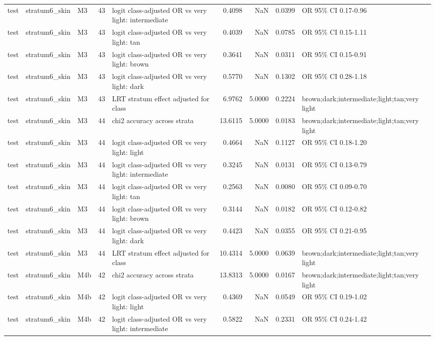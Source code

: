 \begin{tabular}{lllrlrrrl}
test & stratum6\_skin & M3 & 43 & logit class-adjusted OR vs very light: intermediate & 0.4098 & NaN & 0.0399 & OR 95\% CI 0.17-0.96 \\
test & stratum6\_skin & M3 & 43 & logit class-adjusted OR vs very light: tan & 0.4039 & NaN & 0.0785 & OR 95\% CI 0.15-1.11 \\
test & stratum6\_skin & M3 & 43 & logit class-adjusted OR vs very light: brown & 0.3641 & NaN & 0.0311 & OR 95\% CI 0.15-0.91 \\
test & stratum6\_skin & M3 & 43 & logit class-adjusted OR vs very light: dark & 0.5770 & NaN & 0.1302 & OR 95\% CI 0.28-1.18 \\
test & stratum6\_skin & M3 & 43 & LRT stratum effect adjusted for class & 6.9762 & 5.0000 & 0.2224 & brown;dark;intermediate;light;tan;very light \\
test & stratum6\_skin & M3 & 44 & chi2 accuracy across strata & 13.6115 & 5.0000 & 0.0183 & brown;dark;intermediate;light;tan;very light \\
test & stratum6\_skin & M3 & 44 & logit class-adjusted OR vs very light: light & 0.4664 & NaN & 0.1127 & OR 95\% CI 0.18-1.20 \\
test & stratum6\_skin & M3 & 44 & logit class-adjusted OR vs very light: intermediate & 0.3245 & NaN & 0.0131 & OR 95\% CI 0.13-0.79 \\
test & stratum6\_skin & M3 & 44 & logit class-adjusted OR vs very light: tan & 0.2563 & NaN & 0.0080 & OR 95\% CI 0.09-0.70 \\
test & stratum6\_skin & M3 & 44 & logit class-adjusted OR vs very light: brown & 0.3144 & NaN & 0.0182 & OR 95\% CI 0.12-0.82 \\
test & stratum6\_skin & M3 & 44 & logit class-adjusted OR vs very light: dark & 0.4423 & NaN & 0.0355 & OR 95\% CI 0.21-0.95 \\
test & stratum6\_skin & M3 & 44 & LRT stratum effect adjusted for class & 10.4314 & 5.0000 & 0.0639 & brown;dark;intermediate;light;tan;very light \\
test & stratum6\_skin & M4b & 42 & chi2 accuracy across strata & 13.8313 & 5.0000 & 0.0167 & brown;dark;intermediate;light;tan;very light \\
test & stratum6\_skin & M4b & 42 & logit class-adjusted OR vs very light: light & 0.4369 & NaN & 0.0549 & OR 95\% CI 0.19-1.02 \\
test & stratum6\_skin & M4b & 42 & logit class-adjusted OR vs very light: intermediate & 0.5822 & NaN & 0.2331 & OR 95\% CI 0.24-1.42 \\

\end{tabular}
